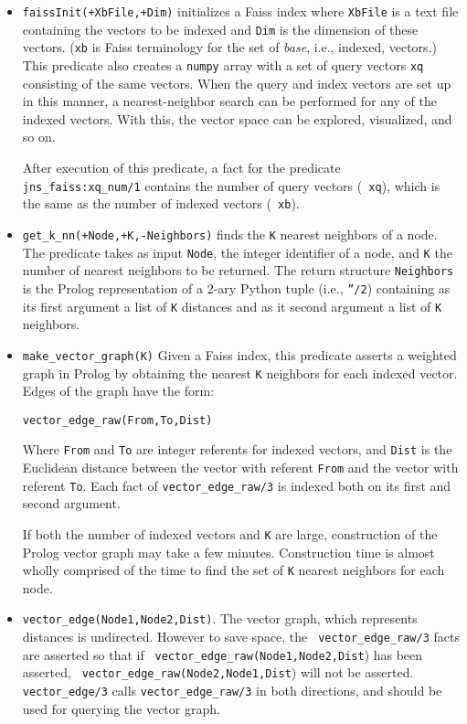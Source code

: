 \begin{itemize}
\item {\tt faissInit(+XbFile,+Dim)} initializes a Faiss index where
  {\tt XbFile} is a text file containing the vectors to be indexed and
  {\tt Dim} is the dimension of these vectors. ({\tt xb} is Faiss
  terminology for the set of {\em base}, i.e., indexed, vectors.)
  This predicate also creates a {\tt numpy} array with a set of query
  vectors {\tt xq} consisting of the same vectors.  When the query and
  index vectors are set up in this manner, a nearest-neighbor search
  can be performed for any of the indexed vectors.  With this, the
  vector space can be explored, visualized, and so on.

  After execution of this predicate, a fact for the predicate {\tt
    jns\_faiss:xq\_num/1} contains the number of query vectors ({\tt
    xq}), which is the same as the number of indexed vectors ({\tt
    xb}).

\item {\tt get\_k\_nn(+Node,+K,-Neighbors)} finds the {\tt K} nearest
  neighbors of a node.  The predicate takes as input {\tt Node}, the
  integer identifier of a node, and {\tt K} the number of nearest
  neighbors to be returned.  The return structure {\tt Neighbors} is
  the Prolog representation of a 2-ary Python tuple (i.e., {\tt ''/2})
  containing as its first argument a list of {\tt K} distances and as
  it second argument a list of {\tt K} neighbors.


\item {\tt make\_vector\_graph(K)} Given a Faiss index, this predicate
  asserts a weighted graph in Prolog by obtaining the nearest {\tt K}
  neighbors for each indexed vector.  Edges of the graph have the form:

  {\tt vector\_edge\_raw(From,To,Dist)}

  \noindent
  Where {\tt From} and {\tt To} are integer referents for indexed
  vectors, and {\tt Dist} is the Euclidean distance between the vector
  with referent {\tt From} and the vector with referent {\tt To}.
  Each fact of {\tt vector\_edge\_raw/3} is indexed both on its first
  and second argument.

  If both the number of indexed vectors and {\tt K} are large,
  construction of the Prolog vector graph may take a few minutes.
  Construction time is almost wholly comprised of the time to find the
  set of {\tt K} nearest neighbors for each node.

\item {\tt vector\_edge(Node1,Node2,Dist)}.  The vector graph, which
  represents distances is undirected.  However to save space, the {\tt
    vector\_edge\_raw/3} facts are asserted so that if {\tt
    vector\_edge\_raw(Node1,Node2,Dist}) has been asserted, {\tt
    vector\_edge\_raw(Node2,Node1,Dist}) will not be asserted.  {\tt
    vector\_edge/3} calls {\tt vector\_edge\_raw/3} in both
  directions, and should be used for querying the vector graph.
  

\end{itemize}
